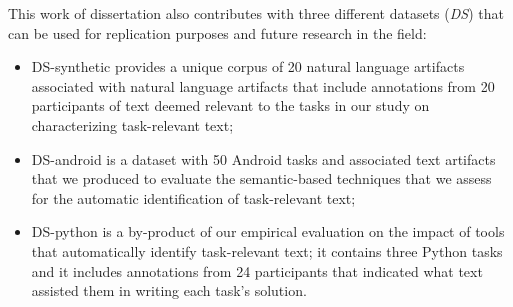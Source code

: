 







    



This work of dissertation also contributes with three different datasets ({\small \textit{DS}}) that can be used for replication purposes and future research in the field:
    
\begin{itemize}
    \item \acs{DS-synthetic} provides a unique corpus of 20 natural language artifacts associated
    with natural language artifacts that include annotations from 20 participants of text deemed relevant to 
    the tasks in our study on characterizing task-relevant text;
    
    \item \acs{DS-android} is a dataset with 50 Android tasks and associated text artifacts 
    that we produced to evaluate the semantic-based techniques that we assess for the automatic identification of task-relevant text;

    \item \acs{DS-python} is a by-product of our empirical evaluation on the impact of tools that automatically identify task-relevant text;
    it contains three Python tasks and it includes annotations from 24 participants that indicated what text assisted them in writing each task's solution.
\end{itemize}
